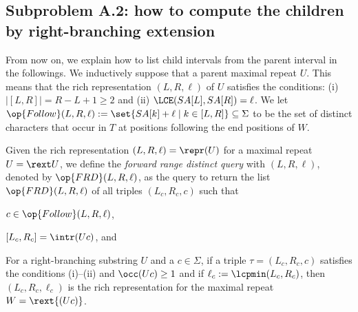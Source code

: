 \subsection{Subproblem A.2: how to compute the children by right-branching extension}



From now on, we explain how to list child intervals from the parent interval in the followings. 
We inductively suppose that a parent maximal repeat $U$. This means that the rich representation $(L,R,\ell)$ of $U$ satisfies the conditions: (i) $|[L,R]| = R - L + 1 \ge 2$ and (ii) $\LCE(SA[L], SA[R]) = \ell$. 
We let $\op{Follow}(L, R, \ell) := \set{SA[k]+\ell \mid k \in [L, R]} \subseteq \Sigma$ to be 
the set of distinct characters that occur in $T$ at positions following the end positions of $W$.

\begin{definition}
Given the rich representation $(L,R,\ell) = \repr(U)$ for a maximal repeat $U = \rext U$, we define the \textit{forward range distinct query} with $(L,R,\ell)$, denoted by $\op{FRD}(L, R, \ell)$, as the query to return the list $\op{FRD}(L, R, \ell)$
of all triples $(L_c, R_c, c)$ such that
\begin{enumerate*}[(i)]
\item $c \in \op{Follow}(L, R, \ell)$, 
\item $[L_c, R_c] = \intr(Uc)$, and 
\end{enumerate*}
\end{definition}

\begin{lemma}
For a right-branching substring $U$ and a $c\in \Sigma$, if a triple $\tau = (L_c, R_c, c)$ satisfies the conditions (i)--(ii) and $\occ(Uc)\ge 1$ and if $\ell_c := \lcpmin(L_c, R_c)$, then $(L_c, R_c, \ell_c)$ is the rich representation for the maximal repeat $W = \rext{(Uc)}$. 
\end{lemma}

